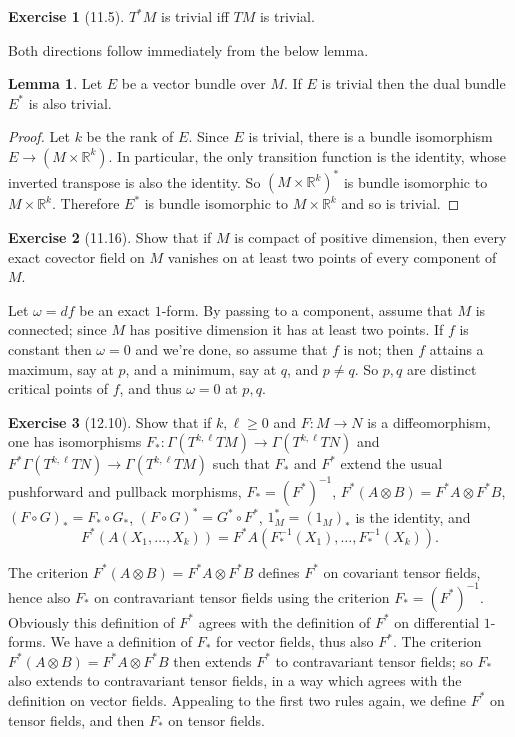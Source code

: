 \documentclass[10pt]{article}
\newcommand{\RR}{\mathbb{R}}
\theoremstyle{definition}
\newtheorem{exer}{Exercise}
\newtheorem{lemma}{Lemma}[exer]
\begin{document}
\begin{exer}[11.5]
$T^*M$ is trivial iff $TM$ is trivial.
\end{exer}

Both directions follow immediately from the below lemma.
\begin{lemma}
Let $E$ be a vector bundle over $M$. If $E$ is trivial then the dual bundle $E^*$ is also trivial.
\end{lemma}
\begin{proof}
Let $k$ be the rank of $E$.
Since $E$ is trivial, there is a bundle isomorphism $E \to (M \times \RR^k)$.
In particular, the only transition function is the identity, whose inverted transpose is also the identity.
So $(M \times \RR^k)^*$ is bundle isomorphic to $M \times \RR^k$.
Therefore $E^*$ is bundle isomorphic to $M \times \RR^k$ and so is trivial.
\end{proof}

\begin{exer}[11.16]
Show that if $M$ is compact of positive dimension, then every exact covector field on $M$ vanishes on at least two points of every component of $M$.
\end{exer}

Let $\omega = df$ be an exact $1$-form.
By passing to a component, assume that $M$ is connected; since $M$ has positive dimension it has at least two points.
If $f$ is constant then $\omega = 0$ and we're done, so assume that $f$ is not; then $f$ attains a maximum, say at $p$, and a minimum, say at $q$, and $p \neq q$.
So $p,q$ are distinct critical points of $f$, and thus $\omega = 0$ at $p,q$.

\begin{exer}[12.10]
Show that if $k, \ell \geq 0$ and $F: M \to N$ is a diffeomorphism, one has isomorphisms $F_*: \Gamma(T^{k,\ell}TM) \to \Gamma(T^{k,\ell}TN)$ and $F^* \Gamma(T^{k,\ell}TN) \to \Gamma(T^{k,\ell}TM)$ such that $F_*$ and $F^*$ extend the usual pushforward and pullback morphisms,
$F_* = (F^*)^{-1}$, $F^*(A \otimes B) = F^*A \otimes F^*B$, $(F \circ G)_* = F_* \circ G_*$, $(F \circ G)^* = G^* \circ F^*$, $1_M^* = (1_M)_*$ is the identity, and
$$F^*(A(X_1, \dots, X_k)) = F^*A(F^{-1}_*(X_1), \dots, F^{-1}_*(X_k)).$$
\end{exer}

The criterion $F^*(A \otimes B) = F^*A \otimes F^*B$ defines $F^*$ on covariant tensor fields, hence also $F_*$ on contravariant tensor fields using the criterion $F_* = (F^*)^{-1}$.
Obviously this definition of $F^*$ agrees with the definition of $F^*$ on differential $1$-forms.
We have a definition of $F_*$ for vector fields, thus also $F^*$. The criterion $F^*(A \otimes B) = F^*A \otimes F^*B$ then extends $F^*$ to contravariant tensor fields; so $F_*$ also extends to contravariant tensor fields, in a way which agrees with the definition on vector fields.
Appealing to the first two rules again, we define $F^*$ on tensor fields, and then $F_*$ on tensor fields.
\end{document}
